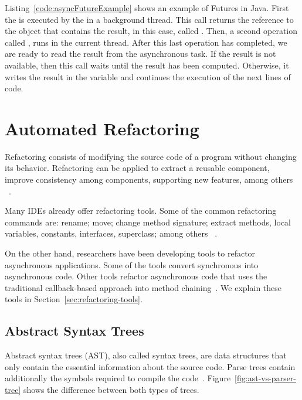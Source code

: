 \documentclass[type=bsc,accentcolor=tud9c]{tudthesis}
\newcommand{\framework}[1]{\textcolor{black!65}{#1}}
\begin{document}
Listing~\ref{code:asyncFutureExample} shows an example of Futures in \framework{Java}. First the  is executed by the  in a background thread. This call returns the reference to the object that contains the result, in this case, called . Then, a second operation called , runs in the current thread. After this last operation has completed, we are ready to read the result from the asynchronous task. If the result is not available, then this call waits until the result has been computed. Otherwise, it writes the result in the variable  and continues the execution of the next lines of code.

\section{Automated Refactoring}
\label{sec:automated-refactoring}
Refactoring consists of modifying the source code of a program without changing its behavior. Refactoring can be applied to extract a reusable component, improve consistency among components, supporting new features, among others ~\cite{thesisRefactoringFrameworks}. 

Many IDEs already offer refactoring tools. Some of the common refactoring commands are: rename; move; change method signature; extract methods, local variables, constants, interfaces, superclass; among others ~\cite{eclipse, intelliJ}. 

On the other hand, researchers have been developing tools to refactor asynchronous applications. Some of the tools convert synchronous into asynchronous code. Other tools refactor asynchronous code that uses the traditional callback-based approach into method chaining~\cite{paperAsyncMobile, paperStudyRefactoring, thesisJavaScript, paperRetrofittingConcurrency}. We explain these tools in Section~\ref{sec:refactoring-tools}.

\subsection{Abstract Syntax Trees}
Abstract syntax trees (AST), also called syntax trees, are data structures that only contain the essential information about the source code. Parse trees contain additionally the symbols required to compile the code~\cite{bookAST}. Figure~\ref{fig:ast-vs-parser-tree} shows the difference between both types of trees.


\end{document}

